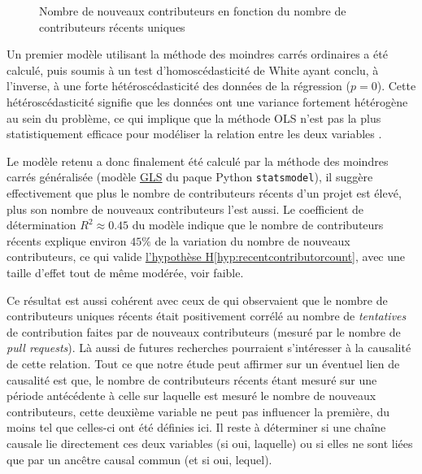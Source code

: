 \documentclass[dvipsnames,runningheads]{llncs}
\newcommand{\en}[1]{\foreignlanguage{english}{\emph{#1}}}
\begin{document}
\begin{figure}
        

        

        \caption{Nombre de nouveaux contributeurs en fonction du nombre de contributeurs récents uniques}
        \label{fig:contributorCount}
    \end{figure}

    Un premier modèle utilisant la méthode des moindres carrés ordinaires a été calculé, puis soumis à un test
    d'homoscédasticité de White ayant conclu, à l'inverse, à une forte hétéroscédasticité des données de la
    régression ($p = 0$). Cette hétéroscédasticité signifie que les données ont une variance fortement
    hétérogène au sein du problème, ce qui implique que la méthode OLS n'est pas la plus statistiquement
    efficace pour modéliser la relation entre les deux variables \parencite{GLS-2021}.

    Le modèle retenu a donc finalement été calculé par la méthode des moindres carrés généralisée (modèle
    \href{https://www.statsmodels.org/dev/generated/statsmodels.regression.linear_model.GLS.html}{GLS} du
    paque Python \texttt{statsmodel}), il suggère effectivement que plus le nombre de contributeurs récents
    d'un projet est élevé, plus son nombre de nouveaux contributeurs l'est aussi. Le coefficient de
    détermination $R^2 \approx 0.45$ du modèle indique que le nombre de contributeurs récents explique environ
    $45\%$ de la variation du nombre de nouveaux contributeurs, ce qui valide
    \hyperref[hyp:recentcontributorcount]{l'hypothèse H\ref*{hyp:recentcontributorcount}}, avec une taille
    d'effet tout de même modérée, voir faible.

    Ce résultat est aussi cohérent avec ceux de \textcite[p.~12-13,16]{signals-2019} qui observaient que le
    nombre de contributeurs uniques récents était positivement corrélé au nombre de \emph{tentatives} de
    contribution faites par de nouveaux contributeurs (mesuré par le nombre de \en{pull requests}). Là aussi
    de futures recherches pourraient s'intéresser à la causalité de cette relation. Tout ce que notre étude
    peut affirmer sur un éventuel lien de causalité est que, le nombre de contributeurs récents étant mesuré
    sur une période antécédente à celle sur laquelle est mesuré le nombre de nouveaux contributeurs, cette
    deuxième variable ne peut pas influencer la première, du moins tel que celles-ci ont été définies ici. Il
    reste à déterminer si une chaîne causale lie directement ces deux variables (si oui, laquelle) ou si elles
    ne sont liées que par un ancêtre causal commun (et si oui, lequel).
\end{document}
